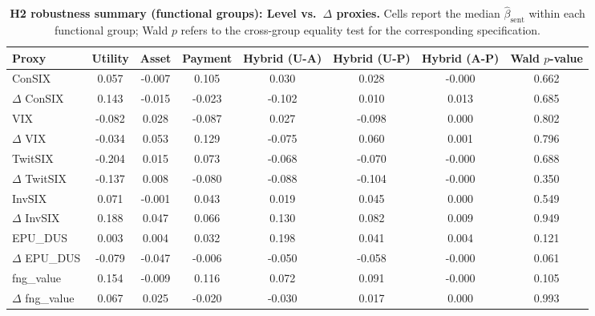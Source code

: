 \begin{table}
\caption{\textbf{H2 robustness summary (functional groups): Level vs.\ $\Delta$ proxies.} Cells report the median $\hat{\beta}_{\mathrm{sent}}$ within each functional group; Wald $p$ refers to the cross-group equality test for the corresponding specification.}
\label{tab:h2_level_vs_delta_summary}
\begin{tabular}{lccccccc}
\toprule
Proxy & Utility & Asset & Payment & Hybrid (U-A) & Hybrid (U-P) & Hybrid (A-P) & Wald $p$-value \\
\midrule
ConSIX & 0.057 & -0.007 & 0.105 & 0.030 & 0.028 & -0.000 & 0.662 \\
$\Delta$ ConSIX & 0.143 & -0.015 & -0.023 & -0.102 & 0.010 & 0.013 & 0.685 \\
VIX & -0.082 & 0.028 & -0.087 & 0.027 & -0.098 & 0.000 & 0.802 \\
$\Delta$ VIX & -0.034 & 0.053 & 0.129 & -0.075 & 0.060 & 0.001 & 0.796 \\
TwitSIX & -0.204 & 0.015 & 0.073 & -0.068 & -0.070 & -0.000 & 0.688 \\
$\Delta$ TwitSIX & -0.137 & 0.008 & -0.080 & -0.088 & -0.104 & -0.000 & 0.350 \\
InvSIX & 0.071 & -0.001 & 0.043 & 0.019 & 0.045 & 0.000 & 0.549 \\
$\Delta$ InvSIX & 0.188 & 0.047 & 0.066 & 0.130 & 0.082 & 0.009 & 0.949 \\
EPU_DUS & 0.003 & 0.004 & 0.032 & 0.198 & 0.041 & 0.004 & 0.121 \\
$\Delta$ EPU_DUS & -0.079 & -0.047 & -0.006 & -0.050 & -0.058 & -0.000 & 0.061 \\
fng_value & 0.154 & -0.009 & 0.116 & 0.072 & 0.091 & -0.000 & 0.105 \\
$\Delta$ fng_value & 0.067 & 0.025 & -0.020 & -0.030 & 0.017 & 0.000 & 0.993 \\
\bottomrule
\end{tabular}
\end{table}
